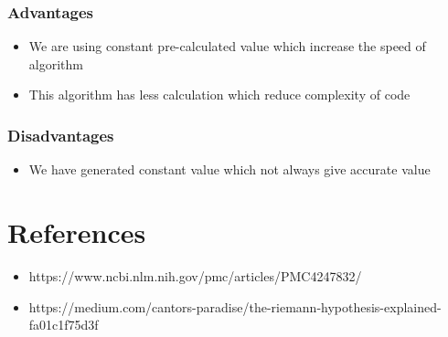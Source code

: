 \documentclass{article}
\begin{document}
\subsubsection{Advantages}
\begin{itemize}
\item We are using constant pre-calculated value which increase the speed of algorithm
\item This algorithm has less calculation which reduce complexity of code
\end{itemize}
\subsubsection{Disadvantages}
\begin{itemize}
\item We have generated constant value which not always give accurate value
\end{itemize}


\section{References}
\begin{itemize}
\item https://www.ncbi.nlm.nih.gov/pmc/articles/PMC4247832/
\item https://medium.com/cantors-paradise/the-riemann-hypothesis-explained-fa01c1f75d3f
\end{itemize}
\end{document}
